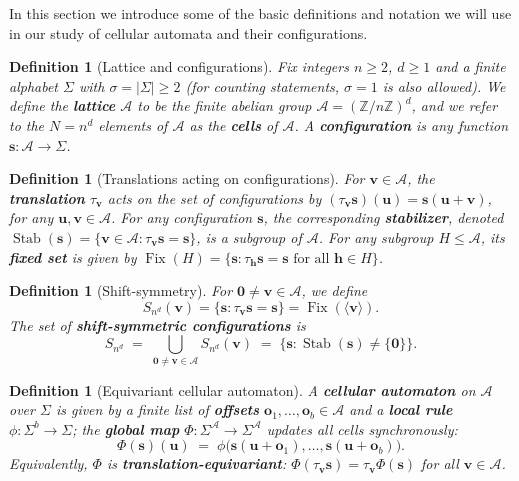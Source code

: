 \documentclass[11pt,a4paper]{article}
\newtheorem{definition}[theorem]{Definition}
\theoremstyle{remark}
\DeclareMathOperator{\Fix}{Fix}
\DeclareMathOperator{\Stab}{Stab}
\newcommand{\ZZ}{\mathbb{Z}}
\newcommand{\A}{\mathcal{A}}
\newcommand{\vv}{\mathbf{v}}
\newcommand{\uu}{\mathbf{u}}
\newcommand{\ssb}{\mathbf{s}}
\begin{document}
In this section we introduce some of the basic definitions and notation we will use in our study of cellular automata and their configurations.

\begin{definition}[Lattice and configurations]
Fix integers $n\ge2$, $d\ge1$ and a finite alphabet $\Sigma$ with
$\sigma=|\Sigma|\ge2$ (for counting statements, $\sigma=1$ is also allowed).
We define the {\bf lattice} $\A$ to be the finite abelian group $\A=(\ZZ/n\ZZ)^d$, and we refer to the $N=n^d$ elements of $\A$ as the {\bf cells} of $\A$.
A {\bf configuration} is any function $\ssb:\A\to\Sigma$. 
\end{definition}

\begin{definition}[Translations acting on configurations] For
$\vv\in\A$, the {\bf translation} $\tau_\vv$ acts on the set of configurations by
$(\tau_\vv\ssb)(\uu)=\ssb(\uu+\vv)$, for any $\uu, \vv \in \A$. For any configuration $\ssb$, the corresponding {\bf stabilizer}, denoted
$\Stab(\ssb)=\{\vv\in\A:\tau_\vv\ssb=\ssb\}$, is a subgroup of $\A$. For any subgroup $H\le\A$, its {\bf fixed set} is given by $\Fix(H)=\{\ssb:\tau_{\mathbf h}\ssb=\ssb\text{ for all }\mathbf h\in H\}$.
\end{definition}

\begin{definition}[Shift-symmetry] For ${\mathbf 0} \neq \vv \in \A$, we define
\[S_{n^d}(\vv)=\{\ssb:\tau_\vv\ssb=\ssb\}=\Fix(\langle\vv\rangle).\] 
The set of {\bf shift-symmetric configurations} is
\[
    S_{n^d} \;=\; \bigcup_{\mathbf 0\neq\vv\in\A} S_{n^d}(\vv)
    \;=\; \{\ssb : \Stab(\ssb)\neq\{\mathbf 0\}\}.
\]
\end{definition}

\begin{definition}[Equivariant cellular automaton]\label{def:ca}
A {\bf cellular automaton} on $\A$ over $\Sigma$ is given by a finite list
of {\bf offsets} $\mathbf o_1,\dots,\mathbf o_b\in\A$ and a {\bf local
rule} $\phi:\Sigma^b\to\Sigma$; the {\bf global map}
$\Phi:\Sigma^{\A}\to\Sigma^{\A}$ updates all cells synchronously:
\[
    \Phi(\ssb)(\uu)\;=\;\phi\bigl(\ssb(\uu+\mathbf o_1),\dots,
    \ssb(\uu+\mathbf o_b)\bigr).
\]
Equivalently, $\Phi$
is {\bf translation-equivariant}: $\Phi(\tau_\vv\ssb)=\tau_\vv\Phi(\ssb)$
for all $\vv\in\A$. 
\end{definition}
\end{document}
